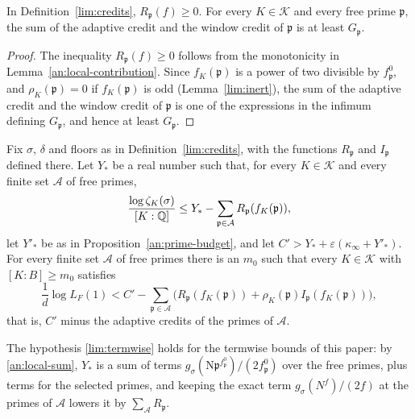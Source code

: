 \begin{lemma}\label{lim:credit-sum}
In Definition~\ref{lim:credits}, $R_{\mathfrak p}(f)\ge0$. For every
$K\in\mathcal K$ and every free prime $\mathfrak p$, the sum of the adaptive
credit and the window credit of $\mathfrak p$ is at least $G_{\mathfrak p}$.
\end{lemma}

\begin{proof}
The inequality $R_{\mathfrak p}(f)\ge0$ follows from the monotonicity in
Lemma~\ref{an:local-contribution}. Since $f_K(\mathfrak p)$ is a power of two
divisible by $f^0_{\mathfrak p}$, and $\rho_K(\mathfrak p)=0$ if
$f_K(\mathfrak p)$ is odd (Lemma~\ref{lim:inert}), the sum of the adaptive
credit and the window credit of $\mathfrak p$ is one of the expressions in the
infimum defining $G_{\mathfrak p}$, and hence at least $G_{\mathfrak p}$.
\end{proof}

\begin{proposition}\label{lim:A}
Fix $\sigma$, $\delta$ and floors as in Definition~\ref{lim:credits}, with
the functions $R_{\mathfrak p}$ and $I_{\mathfrak p}$ defined there. Let
$Y_*$ be a real number such that, for every $K\in\mathcal K$ and every
finite set $\mathcal A$ of free primes,
\begin{equation}\label{lim:termwise}
 \frac{\log\zeta_K(\sigma)}{[K:\mathbb Q]}\le Y_*-\sum_{\mathfrak p\in\mathcal A}
 R_{\mathfrak p}(f_K(\mathfrak p)),
\end{equation}
let $Y'_*$ be as in Proposition~\ref{an:prime-budget}, and let
$C'>Y_*+\varepsilon(\kappa_\infty+Y'_*)$. For every finite set $\mathcal A$
of free primes there is an $m_0$ such that every $K\in\mathcal K$ with
$[K:B]\ge m_0$ satisfies
\[
 \frac1d\log L_F(1)<C'-\sum_{\mathfrak p\in\mathcal A}\bigl(R_{\mathfrak p}(f_K(\mathfrak p))
 +\rho_K(\mathfrak p)I_{\mathfrak p}(f_K(\mathfrak p))\bigr),
\]
that is, $C'$ minus the adaptive credits of the primes of $\mathcal A$.
\end{proposition}

\begin{remark}\label{lim:termwise-remark}
The hypothesis \eqref{lim:termwise} holds for the termwise bounds of this
paper: by \eqref{an:local-sum}, $Y_*$ is a sum of terms
$g_\sigma(\mathrm N\mathfrak p^{f^0_{\mathfrak p}})/(2f^0_{\mathfrak p})$ over the
free primes, plus terms for the selected primes, and keeping the exact term
$g_\sigma(N^f)/(2f)$ at the primes of $\mathcal A$ lowers it by
$\sum_{\mathcal A}R_{\mathfrak p}$.
\end{remark}

